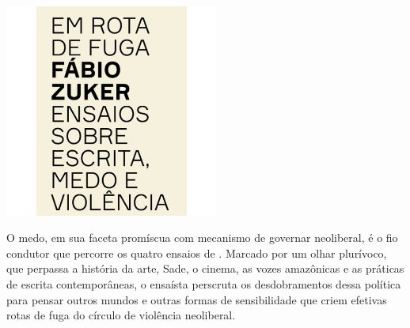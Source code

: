 \begin{center}
\hspace*{-3cm}
\hspace*{3cm}\includegraphics[width=70mm]{./grid/zuker.jpeg}
\end{center}

\hspace*{-7cm}\hrulefill\hspace*{-7cm}


\medskip

\noindent{}O medo, em sua faceta promíscua com mecanismo de governar neoliberal, é o fio condutor que percorre os quatro ensaios de {}. Marcado por um olhar plurívoco, que perpassa a história da arte, Sade, o cinema, as vozes amazônicas e as práticas de escrita contemporâneas, o ensaísta perscruta os desdobramentos dessa política para pensar outros mundos e outras formas de sensibilidade que criem efetivas rotas de fuga do círculo de violência neoliberal.

\vfill

\hspace*{-.4cm}\begin{minipage}[c]{1\linewidth}
\small{
{}}
\end{minipage}


